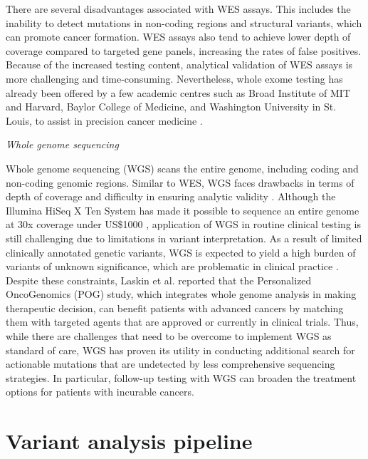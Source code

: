 There are several disadvantages associated with WES assays. This includes the inability to detect mutations in non-coding regions and structural variants, which can promote cancer formation. WES assays also tend to achieve lower depth of coverage compared to targeted gene panels, increasing the rates of false positives. Because of the increased testing content, analytical validation of WES assays is more challenging and time-consuming. Nevertheless, whole exome testing has already been offered by a few academic centres such as Broad Institute of \acs{MIT} and Harvard, Baylor College of Medicine, and Washington University in St. Louis, to assist in precision cancer medicine \cite{Simon2013, Rabbani2014}.

\vspace{5mm}
\noindent\textit{Whole genome sequencing}

Whole genome sequencing (\acs{WGS}) scans the entire genome, including coding and non-coding genomic regions. Similar to WES, WGS faces drawbacks in terms of depth of coverage and difficulty in ensuring analytic validity \cite{Simon2013}. Although the Illumina HiSeq X Ten System has made it possible to sequence an entire genome at 30x coverage under US\$1000 \cite{Dong2015}, application of WGS in routine clinical testing is still challenging due to limitations in variant interpretation. As a result of limited clinically annotated genetic variants, WGS is expected to yield a high burden of variants of unknown significance, which are problematic in clinical practice \cite{Rehm2013, Simon2013}. Despite these constraints, Laskin et al. \cite{Laskin2015} reported that the Personalized OncoGenomics (POG) study, which integrates whole genome analysis in making therapeutic decision, can benefit patients with advanced cancers by matching them with targeted agents that are approved or currently in clinical trials. Thus, while there are challenges that need to be overcome to implement WGS as standard of care, WGS has proven its utility in conducting additional search for actionable mutations that are undetected by less comprehensive sequencing strategies. In particular, follow-up testing with WGS can broaden the treatment options for patients with incurable cancers.

\section{Variant analysis pipeline}
\label{sec:Variantanalysispipeline}

